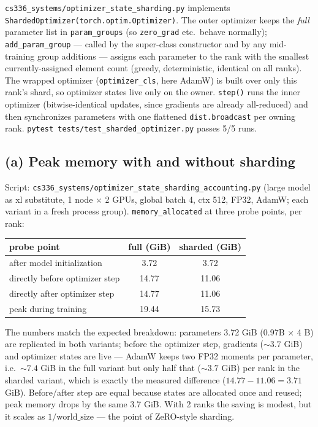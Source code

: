 \documentclass[11pt]{article}
\newcommand{\code}[1]{\texttt{#1}}
\begin{document}
\code{cs336\_systems/optimizer\_state\_sharding.py} implements
\code{ShardedOptimizer(torch.optim.Optimizer)}. The outer optimizer keeps the \emph{full} parameter
list in \code{param\_groups} (so \code{zero\_grad} etc.\ behave normally); \code{add\_param\_group}
--- called by the super-class constructor and by any mid-training group additions --- assigns each
parameter to the rank with the smallest currently-assigned element count (greedy, deterministic,
identical on all ranks). The wrapped optimizer (\code{optimizer\_cls}, here AdamW) is built over
only this rank's shard, so optimizer states live only on the owner. \code{step()} runs the inner
optimizer (bitwise-identical updates, since gradients are already all-reduced) and then
synchronizes parameters with one flattened \code{dist.broadcast} per owning rank.
\code{pytest tests/test\_sharded\_optimizer.py} passes 5/5 runs.

\subsection{(a) Peak memory with and without sharding}

Script: \code{cs336\_systems/optimizer\_state\_sharding\_accounting.py} (large model as xl
substitute, 1 node $\times$ 2 GPUs, global batch 4, ctx 512, FP32, AdamW; each variant in a fresh
process group). \code{memory\_allocated} at three probe points, per rank:

\begin{center}\small
\begin{tabular}{lcc}
\toprule
probe point & full (GiB) & sharded (GiB) \\
\midrule
after model initialization     & 3.72  & 3.72 \\
directly before optimizer step & 14.77 & 11.06 \\
directly after optimizer step  & 14.77 & 11.06 \\
\midrule
peak during training           & 19.44 & 15.73 \\
\bottomrule
\end{tabular}
\end{center}

The numbers match the expected breakdown: parameters 3.72 GiB (0.97B $\times$ 4 B) are replicated
in both variants; before the optimizer step, gradients (${\sim}3.7$ GiB) and optimizer states are
live --- AdamW keeps two FP32 moments per parameter, i.e.\ ${\sim}7.4$ GiB in the full variant but
only half that (${\sim}3.7$ GiB) per rank in the sharded variant, which is exactly the measured
difference ($14.77 - 11.06 = 3.71$ GiB). Before/after step are equal because states are allocated
once and reused; peak memory drops by the same 3.7 GiB. With 2 ranks the saving is modest, but it
scales as $1/\text{world\_size}$ --- the point of ZeRO-style sharding.
\end{document}
